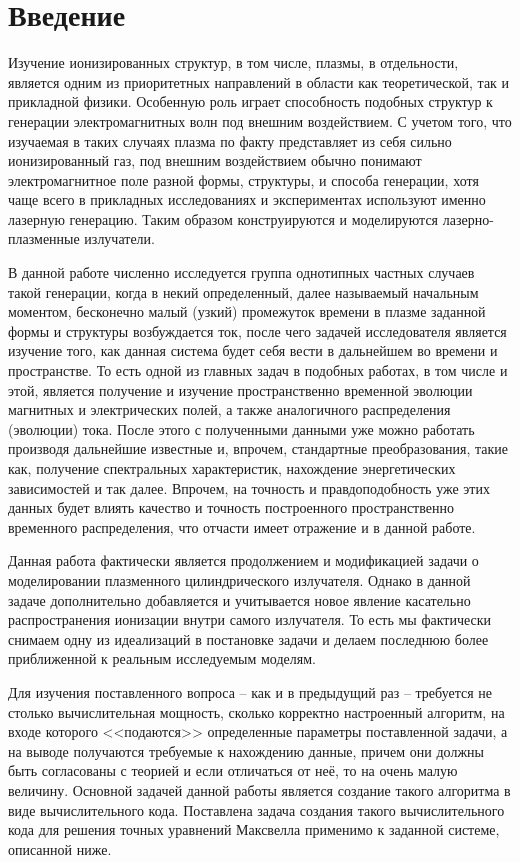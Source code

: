\documentclass[a4paper]{article}
\begin{document}
\fontsize{14}{21pt}\selectfont	
\setcounter{page}{2}
\tableofcontents
\newpage

\section*{Введение}
	
Изучение ионизированных структур, в том числе, плазмы, в отдельности, является одним из приоритетных направлений в области как теоретической, так и прикладной физики. Особенную роль играет способность подобных структур к генерации электромагнитных волн под внешним воздействием. С учетом того, что изучаемая в таких случаях плазма по факту представляет из себя сильно ионизированный газ, под внешним воздействием обычно понимают электромагнитное поле разной формы, структуры, и способа генерации, хотя чаще всего в прикладных исследованиях и экспериментах используют именно лазерную генерацию. Таким образом конструируются и моделируются лазерно-плазменные излучатели.

В данной работе численно исследуется группа однотипных частных случаев такой генерации, когда в некий определенный, далее называемый начальным моментом, бесконечно малый (узкий) промежуток времени в плазме заданной формы и структуры возбуждается ток, после чего задачей исследователя является изучение того, как данная система будет себя вести в дальнейшем во времени и пространстве. То есть одной из главных задач в подобных работах, в том числе и этой, является получение и изучение пространственно временной эволюции магнитных и электрических полей, а также аналогичного распределения (эволюции) тока. После этого с полученными данными уже можно работать производя дальнейшие известные и, впрочем, стандартные преобразования, такие как, получение спектральных характеристик, нахождение энергетических зависимостей и так далее. Впрочем, на точность и правдоподобность уже этих данных будет влиять качество и точность построенного пространственно временного распределения, что отчасти имеет отражение и в данной работе.

Данная работа фактически является продолжением и модификацией задачи о моделировании плазменного цилиндрического излучателя. Однако в данной задаче дополнительно добавляется и учитывается новое явление касательно распространения ионизации внутри самого излучателя. То есть мы фактически снимаем одну из идеализаций в постановке задачи и делаем последнюю более приближенной к реальным исследуемым моделям.

Для изучения поставленного вопроса -- как и в предыдущий раз -- требуется не столько вычислительная мощность, сколько корректно настроенный алгоритм, на входе которого <<подаются>> определенные параметры поставленной задачи, а на выводе получаются требуемые к нахождению данные, причем они должны быть согласованы с теорией и если отличаться от неё, то на очень малую величину. Основной задачей данной работы является создание такого алгоритма в виде вычислительного кода. Поставлена задача создания такого вычислительного кода для решения точных уравнений Максвелла применимо к заданной системе, описанной ниже.
\end{document}
